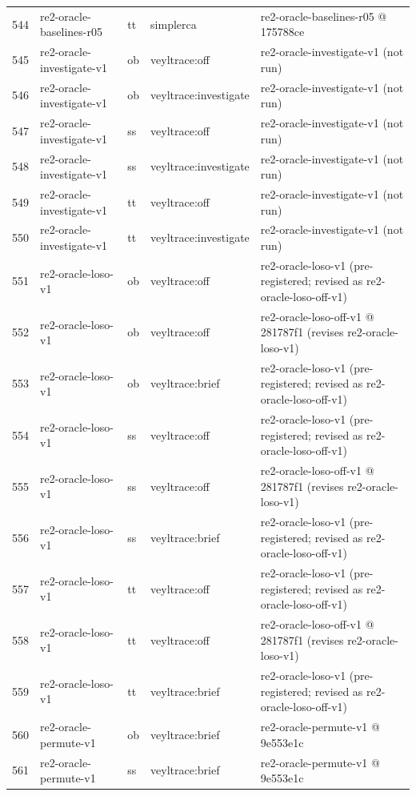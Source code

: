 \begin{longtable}{@{}r>{\raggedright\arraybackslash}p{87.0pt}>{\raggedright\arraybackslash}p{18.0pt}>{\raggedright\arraybackslash}p{63.0pt}>{\raggedright\arraybackslash}p{108.0pt}@{}}
544 & re2-oracle-baselines-r05 & tt & simplerca & re2-oracle-baselines-r05 @ 175788ce \\
545 & re2-oracle-investigate-v1 & ob & veyltrace:off & re2-oracle-investigate-v1 (not run) \\
546 & re2-oracle-investigate-v1 & ob & veyltrace:investigate & re2-oracle-investigate-v1 (not run) \\
547 & re2-oracle-investigate-v1 & ss & veyltrace:off & re2-oracle-investigate-v1 (not run) \\
548 & re2-oracle-investigate-v1 & ss & veyltrace:investigate & re2-oracle-investigate-v1 (not run) \\
549 & re2-oracle-investigate-v1 & tt & veyltrace:off & re2-oracle-investigate-v1 (not run) \\
550 & re2-oracle-investigate-v1 & tt & veyltrace:investigate & re2-oracle-investigate-v1 (not run) \\
551 & re2-oracle-loso-v1 & ob & veyltrace:off & re2-oracle-loso-v1 (pre-registered; revised as re2-oracle-loso-off-v1) \\
552 & re2-oracle-loso-v1 & ob & veyltrace:off & re2-oracle-loso-off-v1 @ 281787f1 (revises re2-oracle-loso-v1) \\
553 & re2-oracle-loso-v1 & ob & veyltrace:brief & re2-oracle-loso-v1 (pre-registered; revised as re2-oracle-loso-off-v1) \\
554 & re2-oracle-loso-v1 & ss & veyltrace:off & re2-oracle-loso-v1 (pre-registered; revised as re2-oracle-loso-off-v1) \\
555 & re2-oracle-loso-v1 & ss & veyltrace:off & re2-oracle-loso-off-v1 @ 281787f1 (revises re2-oracle-loso-v1) \\
556 & re2-oracle-loso-v1 & ss & veyltrace:brief & re2-oracle-loso-v1 (pre-registered; revised as re2-oracle-loso-off-v1) \\
557 & re2-oracle-loso-v1 & tt & veyltrace:off & re2-oracle-loso-v1 (pre-registered; revised as re2-oracle-loso-off-v1) \\
558 & re2-oracle-loso-v1 & tt & veyltrace:off & re2-oracle-loso-off-v1 @ 281787f1 (revises re2-oracle-loso-v1) \\
559 & re2-oracle-loso-v1 & tt & veyltrace:brief & re2-oracle-loso-v1 (pre-registered; revised as re2-oracle-loso-off-v1) \\
560 & re2-oracle-permute-v1 & ob & veyltrace:brief & re2-oracle-permute-v1 @ 9e553e1c \\
561 & re2-oracle-permute-v1 & ss & veyltrace:brief & re2-oracle-permute-v1 @ 9e553e1c \\

\end{longtable}
